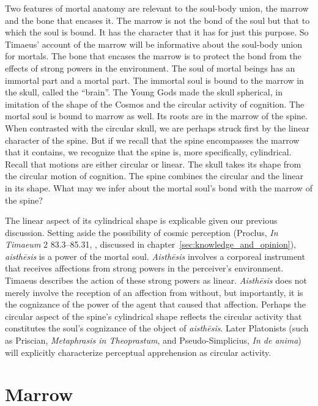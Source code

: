 Two features of mortal anatomy are relevant to the soul-body union, the marrow and the bone that encases it. The marrow is not the bond of the soul but that to which the soul is bound. It has the character that it has for just this purpose. So Timaeus' account of the marrow will be informative about the soul-body union for mortals. The bone that encases the marrow is to protect the bond from the effects of strong powers in the environment. The soul of mortal beings has an immortal part and a mortal part. The immortal soul is bound to the marrow in the skull, called the ``brain''. The Young Gods made the skull spherical, in imitation of the shape of the Cosmos and the circular activity of cognition. The mortal soul is bound to marrow as well. Its roots are in the marrow of the spine. When contrasted with the circular skull, we are perhaps struck first by the linear character of the spine. But if we recall that the spine encompasses the marrow that it contains, we recognize that the spine is, more specifically, cylindrical. Recall that motions are either circular or linear. The skull takes its shape from the circular motion of cognition. The spine combines the circular and the linear in its shape. What may we infer about the mortal soul's bond with the marrow of the spine?

The linear aspect of its cylindrical shape is explicable given our previous discussion. Setting aside the possibility of cosmic perception (Proclus, \emph{In Timaeum} 2 83.3–85.31, \citealt{Diehl:1903re}, discussed in chapter~\ref{sec:knowledge_and_opinion}), \emph{aisthēsis} is a power of the mortal soul. \emph{Aisthēsis} involves a corporeal instrument that receives affections from strong powers in the perceiver's environment. Timaeus describes the action of these strong powers as linear. \emph{Aisthēsis} does not merely involve the reception of an affection from without, but importantly, it is the cognizance of the power of the agent that caused that affection. Perhaps the circular aspect of the spine's cylindrical shape reflects the circular activity that constitutes the soul's cognizance of the object of \emph{aisthēsis}. Later Platonists (such as Priscian, \emph{Metaphrasis in Theoprastum}, and Pseudo-Simplicius, \emph{In de anima}) will explicitly characterize perceptual apprehension as circular activity.


\section{Marrow} %
\label{sec:marrow}

